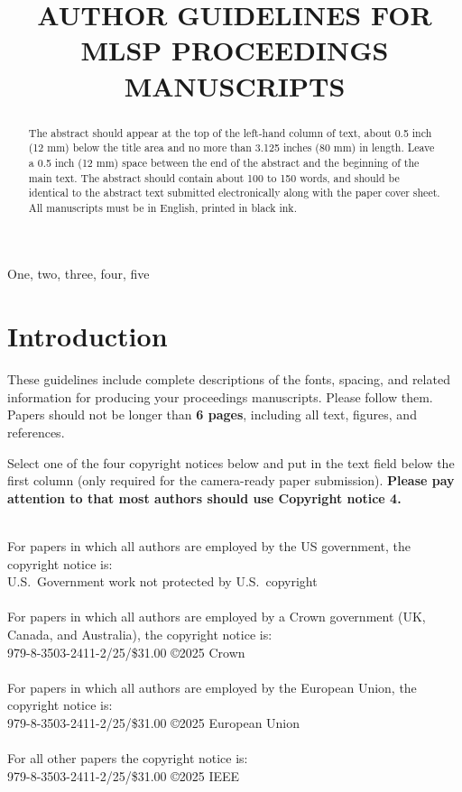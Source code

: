 \documentclass{article}
\title{AUTHOR GUIDELINES FOR MLSP PROCEEDINGS MANUSCRIPTS}
\begin{document}

\maketitle

\begin{abstract}
The abstract should appear at the top of the left-hand column of text, about
0.5 inch (12 mm) below the title area and no more than 3.125 inches (80 mm) in
length.  Leave a 0.5 inch (12 mm) space between the end of the abstract and the
beginning of the main text.  The abstract should contain about 100 to 150
words, and should be identical to the abstract text submitted electronically
along with the paper cover sheet.  All manuscripts must be in English, printed
in black ink.
\end{abstract}
%
\begin{keywords}
One, two, three, four, five
\end{keywords}

\newcommand{\cem}[1]{\textcolor{blue}{cem: #1}}
%
\section{Introduction}
\label{sec:intro}

These guidelines include complete descriptions of the fonts, spacing, and
related information for producing your proceedings manuscripts. Please follow
them. 
Papers should not be longer than \textbf{6 pages}, including all text, figures, and references.

Select one of the four copyright notices below and put in the text field below the first column (only required for the camera-ready paper submission). \textbf{Please pay attention to that most authors should use Copyright notice 4.}

\\
For papers in which all authors are employed by the US government, the copyright notice is:\\
{U.S.\ Government work not protected by U.S.\ copyright}
\\[2ex]
\\
For papers in which all authors are employed by a Crown government (UK, Canada, and Australia), the copyright notice is:\\
{979-8-3503-2411-2/25/\$31.00 {\copyright}2025 Crown}
\\[2ex]
\\
For papers in which all authors are employed by the European Union, the copyright notice is:\\
{979-8-3503-2411-2/25/\$31.00 {\copyright}2025 European Union}
\\[2ex]
\\
For all other papers the copyright notice is:\\
{979-8-3503-2411-2/25/\$31.00 {\copyright}2025 IEEE}
\end{document}
